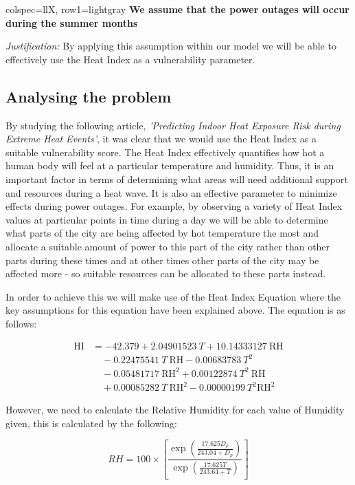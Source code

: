 \documentclass[11pt]{article}
\begin{document}
\begin{longtblr}[
  caption={Variables and parameters.}
]{
  colspec={llX},
  row{1}={lightgray}
}
\noindent
\textbf{\sffamily We assume that the power outages will occur during the summer months}

\textit{Justification:} By applying this assumption within our model we will be able to effectively use the Heat Index as a vulnerability parameter.

\subsection{Analysing the problem}

By studying the following article, \textit{'Predicting Indoor Heat Exposure Risk during Extreme Heat Events'}, it was clear that we would use the Heat Index as a suitable vulnerability score. The Heat Index effectively quantifies how hot a human body will feel at a particular temperature and humidity. Thus, it is an important factor in terms of determining what areas will need additional support and resources during a heat wave. It is also an effective parameter to minimize effects during power outages. For example, by observing a variety of Heat Index values at particular points in time during a day we will be able to determine what parts of the city are being affected by hot temperature the most and allocate a suitable amount of power to this part of the city rather than other parts during these times and at other times other parts of the city may be affected more - so suitable resources can be allocated to these parts instead.

In order to achieve this we will make use of the Heat Index Equation where the key assumptions for this equation have been explained above. The equation is as follows:

\[
\begin{aligned}
\text{HI} &= -42.379 + 2.04901523 \ T + 10.14333127 \ \text{RH} \\
&\quad -0.22475541 \ T \ \text{RH} - 0.00683783  \ T^2 \\
&\quad - 0.05481717 \ \text{RH}^2 + 0.00122874\ T^2 \ \text{RH} \\
&\quad + 0.00085282 \ T \ \text{RH}^2 -0.00000199 \ T^2 \text{RH}^2
\end{aligned}
\]

However, we need to calculate the Relative Humidity for each value of Humidity given, this is calculated by the following:

\[
RH = 100 \times \left[ \frac{\exp\left(\frac{17.625D_p}{243.04+D_p}\right)}{\exp\left(\frac{17.625T}{243.64+T}\right)} \right]
\]


\end{longtblr}
\end{document}
